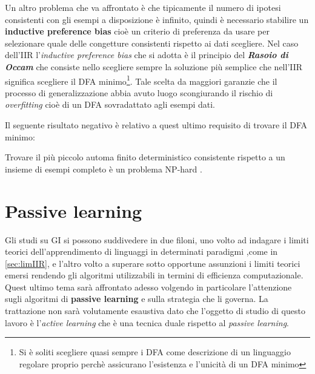 Un altro problema che va affrontato è che tipicamente il numero di ipotesi consistenti  con gli esempi a disposizione è  infinito, quindi è necessario stabilire un \textbf{inductive preference bias} \cite{Abela02} cioè un criterio di preferenza da usare per selezionare quale delle congetture consistenti  rispetto ai dati scegliere. Nel caso dell'\ac{IIR}  l'\textit{inductive preference bias} che si adotta è il principio del \textbf{\textit{Rasoio di Occam}} che consiste nello scegliere sempre la soluzione più semplice che nell'\ac{IIR} significa scegliere il \ac{DFA} minimo\footnote{Si è soliti scegliere quasi sempre i \ac{DFA} come descrizione di un linguaggio regolare proprio perchè assicurano l'esistenza e l'unicità di un \ac{DFA} minimo}. Tale scelta da maggiori garanzie che il processo di generalizzazione abbia avuto luogo scongiurando il rischio di \textit{overfitting} cioè di un \ac{DFA} sovradattato agli esempi dati.

Il seguente risultato negativo è relativo a quest ultimo requisito di trovare il \ac{DFA} minimo:
\begin{teorema}
\label{teo:minhard}
Trovare il più piccolo automa finito deterministico consistente  rispetto a  un insieme di esempi completo è un problema NP-hard \cite{Gold78}.
\end{teorema}

\section{Passive learning}
 
Gli studi su \ac{GI} si possono suddivedere in due filoni, uno volto ad indagare i limiti teorici dell'apprendimento di linguaggi in determinati paradigmi ,come in \ref{sec:limIIR}, e l'altro volto a superare sotto opportune assunzioni i limiti teorici emersi rendendo gli algoritmi utilizzabili in termini di efficienza computazionale. Quest ultimo tema sarà affrontato adesso volgendo in particolare l'attenzione sugli algoritmi di \textbf{passive learning} e sulla strategia che li governa. La trattazione non sarà volutamente esaustiva dato che l'oggetto di studio di questo lavoro è l'\textit{active learning} che è una tecnica duale rispetto al \textit{passive learning}.

